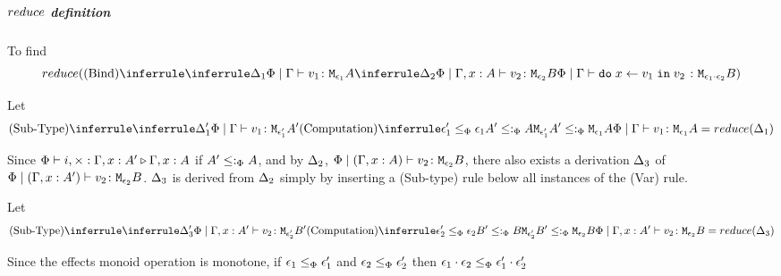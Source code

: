 {        
    
            \subparagraph{$reduce$ definition}

            To find
            \begin{equation}
                \reduce(
                    \ntreeruleII{Bind}{
                        \treeruleI{
                            \D_1
                        }{
                            \gpetyperelation{v_1}{\M{\e_1}{A}}
                        }
                         }{ 
                        \treeruleI{
                            \D_2
                        }{
                            \etyperelation{\P}{\gax}{v_2}{\M{\e_2}{B}}
                        }
                    } {
                        \gpetyperelation{\doin{x}{v_1}{v_2}}{\M{\e_1\dot\e_2}{B}}
                    }
                )
            \end{equation}


            Let \begin{equation}
                \ntreeruleII{Sub-Type}{
                    \treeruleI{\D'_1}{\gpetyperelation{v_1}{\M{\e'_1}{A'}}}
                 }{ 
                \subeffecttree{\e_1'}{A'}{\e_1}{A}
                }{
                    \gpetyperelation{v_1}{\M{\e_1}{A}}
                } = \reduce(\D_1)
            \end{equation}

            Since $\Phi\vdash i,\times : \Gamma, x: A' \triangleright \Gamma, x: A$ if $A' \leq:_\Phi A$, and by $\Delta_2$, $\Phi\mid(\Gamma, x: A) \vdash v_2 \colon \texttt{M}_{\epsilon_2}{B}$, there also exists a derivation $\Delta_3$ of $\Phi\mid(\Gamma, x: A') \vdash v_2 \colon \texttt{M}_{\epsilon_2}{B}$. $\Delta_3$ is derived from $\Delta_2$ simply by inserting a (Sub-type) rule below all instances of the (Var) rule.

            Let \begin{equation}
                \ntreeruleII{Sub-Type}{
                    \treeruleI{\D'_3}{\etyperelation{\P}{\G, x: A'}{v_2}{\M{\e'_2}{B'}}}
                 }{ 
                \subeffecttree{\e_2'}{B'}{\e_2}{B}
                }{
                    \etyperelation{\P}{\G, x: A'}{v_2}{\M{\e_2}{B}}
                } = \reduce(\D_3)
            \end{equation}
            

            Since the effects monoid operation is monotone, if $\epsilon_1\leq_{\Phi}\epsilon_1'$ and $\epsilon_2\leq_{\Phi}\epsilon_2'$ then $\epsilon_1\cdot\epsilon_2 \leq_{\Phi} \epsilon_1'\cdot\epsilon_2'$
            


}

